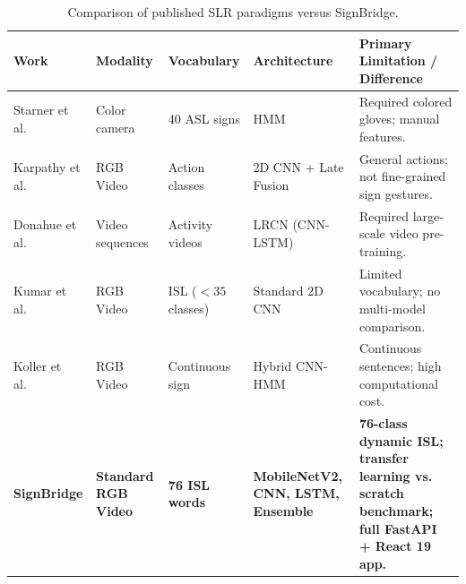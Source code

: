 \begin{table}[htbp]
\centering
\caption{Comparison of published SLR paradigms versus SignBridge.}
\label{tab:lit_comparison}
\scriptsize
\begin{tabularx}{\textwidth}{l p{3.0cm} p{2.4cm} p{3.2cm} X}
\toprule
\textbf{Work} & \textbf{Modality} & \textbf{Vocabulary} & \textbf{Architecture} & \textbf{Primary Limitation / Difference} \\
\midrule
Starner et al.~\cite{starner1998real} & Color camera & 40 ASL signs & HMM & Required colored gloves; manual features. \\
Karpathy et al.~\cite{karpathy2014large} & RGB Video & Action classes & 2D CNN + Late Fusion & General actions; not fine-grained sign gestures. \\
Donahue et al.~\cite{donahue2015long} & Video sequences & Activity videos & LRCN (CNN-LSTM) & Required large-scale video pre-training. \\
Kumar et al.~\cite{kumar2018indian} & RGB Video & ISL ($<35$ classes) & Standard 2D CNN & Limited vocabulary; no multi-model comparison. \\
Koller et al.~\cite{koller2019deep} & RGB Video & Continuous sign & Hybrid CNN-HMM & Continuous sentences; high computational cost. \\
\textbf{SignBridge} & \textbf{Standard RGB Video} & \textbf{76 ISL words} & \textbf{MobileNetV2, CNN, LSTM, Ensemble} & \textbf{76-class dynamic ISL; transfer learning vs. scratch benchmark; full FastAPI + React 19 app.} \\
\bottomrule
\end{tabularx}
\end{table}
